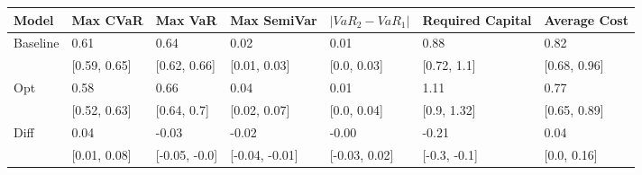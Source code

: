 \begin{tabular}{lllllll}
\toprule
   Model &     Max CVaR &       Max VaR &    Max SemiVar & $|VaR_2 - VaR_1|$ & Required Capital & Average Cost \\
\midrule
Baseline &         0.61 &          0.64 &           0.02 &              0.01 &             0.88 &         0.82 \\
         & [0.59, 0.65] &  [0.62, 0.66] &   [0.01, 0.03] &       [0.0, 0.03] &      [0.72, 1.1] & [0.68, 0.96] \\
     Opt &         0.58 &          0.66 &           0.04 &              0.01 &             1.11 &         0.77 \\
         & [0.52, 0.63] &   [0.64, 0.7] &   [0.02, 0.07] &       [0.0, 0.04] &      [0.9, 1.32] & [0.65, 0.89] \\
    Diff &         0.04 &         -0.03 &          -0.02 &             -0.00 &            -0.21 &         0.04 \\
         & [0.01, 0.08] & [-0.05, -0.0] & [-0.04, -0.01] &     [-0.03, 0.02] &     [-0.3, -0.1] &  [0.0, 0.16] \\
\bottomrule
\end{tabular}
